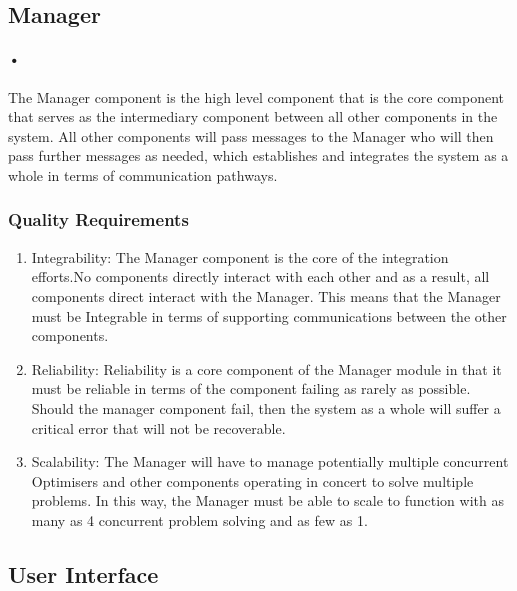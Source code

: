 \documentclass[11pt]{article}
\begin{document}
\subsection{Manager}
\paragraph{•}
The Manager component is the high level component that is the core component that serves as the intermediary component between all other components in the system. All other components will pass messages to the Manager who will then pass further messages as needed, which establishes and integrates the system as a whole in terms of communication pathways.
\subsubsection{Quality Requirements}
\begin{enumerate}
\item Integrability: The Manager component is the core of the integration efforts.No components directly interact with each other and as a result, all components direct interact with the Manager. This means that the Manager must be Integrable in terms of supporting communications between the other components.
\item Reliability: Reliability is a core component of the Manager module in that it must be reliable in terms of the component failing as rarely as possible. Should the manager component fail, then the system as a whole will suffer a critical error that will not be recoverable.
\item Scalability: The Manager will have to manage potentially multiple concurrent Optimisers and other components operating in concert to solve multiple problems. In this way, the Manager must be able to scale to function with as many as 4 concurrent problem solving and as few as 1.
\end{enumerate}

\subsection{User Interface}
\end{document}

